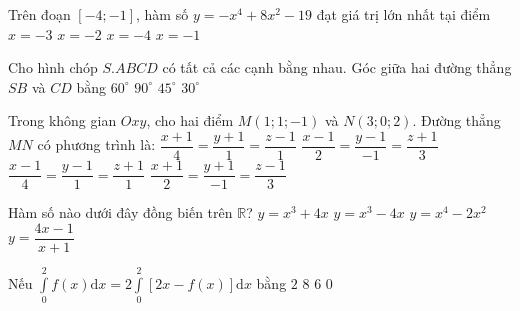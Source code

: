 \begin{ex}%
Trên đoạn $[-4;-1]$, hàm số $y=-x^4+8 x^2-19$ đạt giá trị lớn nhất tại điểm
\choice
{$x=-3$}
{\True $x=-2$}
{$x=-4$}
{$x=-1$}

\end{ex}
\begin{ex}%
Cho hình chóp $S.ABCD$ có tất cả các cạnh bằng nhau. Góc giữa hai đường thẳng $SB$ và $CD$ bằng
\choice
{\True $60^{\circ}$}
{$90^{\circ}$}
{$45^{\circ}$}
{$30^{\circ}$}

\end{ex}
\begin{ex}%
Trong không gian $O x y$, cho hai điểm $M(1; 1;-1)$ và $N(3; 0; 2)$. Đường thẳng $MN$ có phương trình là:
\choice
{$\dfrac{x+1}{4}=\dfrac{y+1}{1}=\dfrac{z-1}{1}$}
{\True $\dfrac{x-1}{2}=\dfrac{y-1}{-1}=\dfrac{z+1}{3}$}
{$\dfrac{x-1}{4}=\dfrac{y-1}{1}=\dfrac{z+1}{1}$}
{$\dfrac{x+1}{2}=\dfrac{y+1}{-1}=\dfrac{z-1}{3}$}

\end{ex}
\begin{ex}%
Hàm số nào dưới đây đồng biến trên $\mathbb{R}$?
\choice
{\True $y=x^3+4 x$}
{$y=x^3-4 x$}
{$y=x^4-2 x^2$}
{$y=\dfrac{4 x-1}{x+1}$}

\end{ex}
\begin{ex}%
Nếu $\displaystyle\int\limits_0^2 f(x) \mathrm{d} x=2\displaystyle\int\limits_0^2[2 x-f(x)] \mathrm{d} x$ bằng
\choice
{\True $2$}
{$8$}
{$6$}
{$0$}

\end{ex}
\begin{ex}%
{\vspace{-0.5cm}
}

\end{ex}

